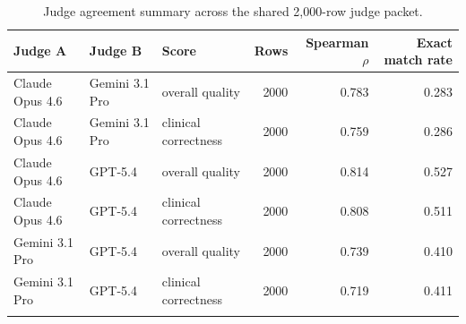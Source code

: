 \begin{table}[t]
\caption{Judge agreement summary across the shared 2,000-row judge packet.}
\label{tab:judge_agreement}
\centering
\scriptsize
\begin{tabular}{@{}lllrrr@{}}
\toprule
Judge A & Judge B & Score & Rows & Spearman $\rho$ & Exact match rate \\
\midrule
Claude Opus 4.6 & Gemini 3.1 Pro & overall quality & 2000 & 0.783 & 0.283 \\
Claude Opus 4.6 & Gemini 3.1 Pro & clinical correctness & 2000 & 0.759 & 0.286 \\
Claude Opus 4.6 & GPT-5.4 & overall quality & 2000 & 0.814 & 0.527 \\
Claude Opus 4.6 & GPT-5.4 & clinical correctness & 2000 & 0.808 & 0.511 \\
Gemini 3.1 Pro & GPT-5.4 & overall quality & 2000 & 0.739 & 0.410 \\
Gemini 3.1 Pro & GPT-5.4 & clinical correctness & 2000 & 0.719 & 0.411 \\
\botrule
\end{tabular}
\normalsize
\end{table}
